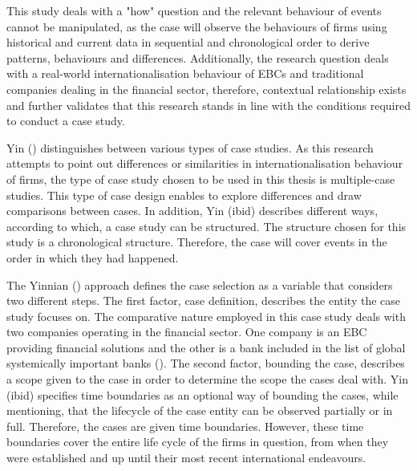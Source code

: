 \documentclass[11pt,a4paper]{article}
\begin{document}
{{This study deals with a "how" question and the relevant behaviour of events cannot be manipulated, as the case will observe the behaviours of firms using historical and current data in sequential and chronological order to derive patterns, behaviours and differences. Additionally, the research question deals with a real-world internationalisation behaviour of EBCs and traditional companies dealing in the financial sector, therefore, contextual relationship exists and further validates that this research stands in line with the conditions required to conduct a case study. \par
Yin (\citeyear{yinCaseStudyResearch2017}) distinguishes between various types of case studies. As this research attempts to point out differences or similarities in internationalisation behaviour of firms, the type of case study chosen to be used in this thesis is multiple-case studies. This type of case design enables to explore differences and draw comparisons between cases. In addition, Yin (ibid) describes different ways, according to which, a case study can be structured. The structure chosen for this study is a chronological structure. Therefore, the case will cover events in the order in which they had happened.  \par

The Yinnian (\citeyear{yinCaseStudyResearch2017}) approach defines the case selection as a variable that considers two different steps. The first factor, case definition, describes the entity the case study focuses on. The comparative nature employed in this case study deals with two companies operating in the financial sector. One company is an EBC providing financial solutions and the other is a bank included in the list of global systemically important banks (\cite{2019ListGlobal2019}).  The second factor,  bounding the case, describes a scope given to the case in order to determine the scope the cases deal with. Yin (ibid) specifies time boundaries as an optional way of bounding the cases, while mentioning, that the lifecycle of the case entity can be observed partially or in full. Therefore, the cases are given time boundaries. However, these time boundaries cover the entire life cycle of the firms in question, from when they were established and up until their most recent international endeavours.   \par

}}
\end{document}

